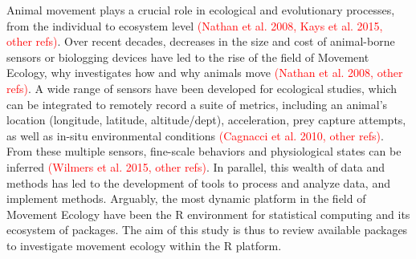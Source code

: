 \documentclass[a4paper,12pt]{article}
\begin{document}
Animal movement plays a crucial role in ecological and evolutionary processes, from the individual to ecosystem level \textcolor{red}{(Nathan et al. 2008, Kays et al. 2015, other refs)}. Over recent decades, decreases in the size and cost of animal-borne sensors or biologging devices have led to the rise of the field of Movement Ecology, why investigates how and why animals move \textcolor{red}{(Nathan et al. 2008, other refs)}. A wide range of sensors have been developed for ecological studies, which can be integrated to remotely record a suite of metrics, including an animal's location (longitude, latitude, altitude/dept), acceleration, prey capture attempts, %
as well as in-situ environmental conditions \textcolor{red}{(Cagnacci et al. 2010, other refs)}.
From these multiple sensors, fine-scale behaviors and physiological states can be inferred \textcolor{red}{(Wilmers et al. 2015, other refs)}. In parallel, this wealth of data and methods has led to the development of tools to process and analyze data, and implement methods. Arguably, the most dynamic platform in the field of Movement Ecology have been the R environment for statistical computing and its ecosystem of packages. %
The aim of this study is thus to review available packages to investigate movement ecology within the R platform. %
\end{document}
